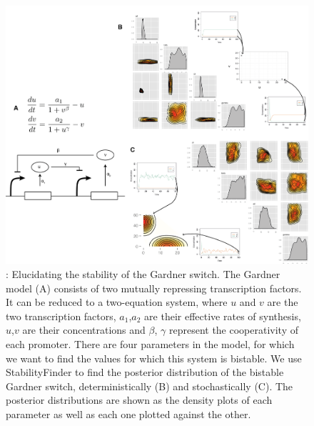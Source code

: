 \begin{figure}[h]
\begin{center}
\includegraphics[width=\textwidth]{chapterStabilityFinder/images/figure-02.png}
\caption[LoF caption]{ \label{fig:fig2}: Elucidating the stability of the Gardner switch. The Gardner model (A) consists of two mutually repressing transcription factors. It can be reduced to a two-equation system, where $u$ and $v$ are the two transcription factors, $a_1$,$a_2$ are their effective rates of synthesis, $u$,$v$ are their concentrations and $\beta$, $\gamma$ represent the cooperativity of each promoter. There are four parameters in the model, for which we want to find the values for which this system is bistable. We use StabilityFinder to find the posterior distribution of the bistable Gardner switch, deterministically (B) and stochastically (C). The posterior distributions are shown as the density plots of each parameter as well as each one plotted against the other. }
\end{center}
\end{figure}
\clearpage

